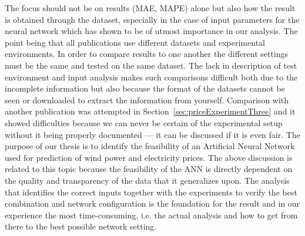 The focus should not be on results (MAE, MAPE) alone but also how the result is obtained through the dataset, especially in the case of input parameters for the neural network which has shown to be of utmost importance in our analysis. The point being that all publications use different datasets and experimental environments. In order to compare results to one another the different settings must be the same and tested on the same dataset. The lack in description of test environment and input analysis makes such comparisons difficult both due to the incomplete information but also because the format of the datasets cannot be seen or downloaded to extract the information from yourself. Comparison with another publication was attempted in Section~\ref{sec:priceExperimentThree} and it showed difficulties because we can never be certain of the experimental setup without it being properly documented --- it can be discussed if it is even fair. The purpose of our thesis is to identify the feasibility of an Artificial Neural Network used for prediction of wind power and electricity prices. The above discussion is related to this topic because the feasibility of the ANN is directly dependent on the quality and transparency of the data that it generalizes upon. The analysis that identifies the correct inputs together with the experiments to verify the best combination and network configuration is the foundation for the result and in our experience the most time-consuming, i.e. the actual analysis and how to get from there to the best possible network setting. 


